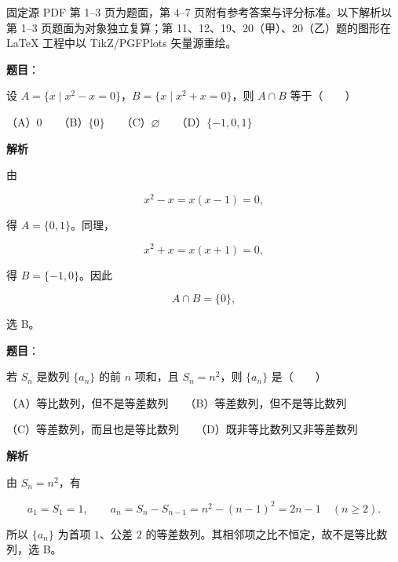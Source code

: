 

\begin{gktip}
固定源 PDF 第 1–3 页为题面，第 4–7 页附有参考答案与评分标准。以下解析以第 1–3 页题面为对象独立复算；第 11、12、19、20（甲）、20（乙）题的图形在 LaTeX 工程中以 TikZ/PGFPlots 矢量源重绘。
\end{gktip}


\begin{answer}

\textbf{题目}：

设 $A=\{x\mid x^2-x=0\}$，$B=\{x\mid x^2+x=0\}$，则 $A\cap B$ 等于\mbox{（　　）}

（A）$0$　　（B）$\{0\}$　　（C）$\varnothing$　　（D）$\{-1,0,1\}$

\textbf{解析}

由

\nopagebreak[4]
\[
x^2-x=x(x-1)=0,
\]

得 $A=\{0,1\}$。同理，

\nopagebreak[4]
\[
x^2+x=x(x+1)=0,
\]

得 $B=\{-1,0\}$。因此

\nopagebreak[4]
\[
A\cap B=\{0\},
\]

选 B。


\end{answer}
\begin{answer}

\textbf{题目}：

若 $S_n$ 是数列 $\{a_n\}$ 的前 $n$ 项和，且 $S_n=n^2$，则 $\{a_n\}$ 是\mbox{（　　）}

（A）等比数列，但不是等差数列　　（B）等差数列，但不是等比数列

（C）等差数列，而且也是等比数列　　（D）既非等比数列又非等差数列

\textbf{解析}

由 $S_n=n^2$，有

\nopagebreak[4]
\[
a_1=S_1=1,\qquad
a_n=S_n-S_{n-1}=n^2-(n-1)^2=2n-1\quad(n\ge2).
\]

所以 $\{a_n\}$ 为首项 $1$、公差 $2$ 的等差数列。其相邻项之比不恒定，故不是等比数列，选 B。


\end{answer}
